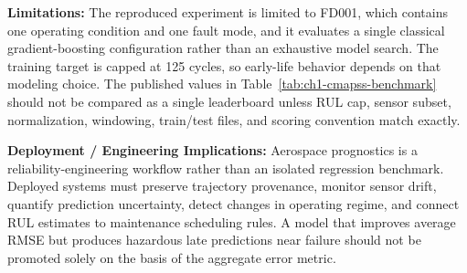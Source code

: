 \textbf{Limitations:} The reproduced experiment is limited to FD001, which contains one operating condition and one fault mode, and it evaluates a single classical gradient-boosting configuration rather than an exhaustive model search. The training target is capped at 125 cycles, so early-life behavior depends on that modeling choice. The published values in Table~\ref{tab:ch1-cmapss-benchmark} should not be compared as a single leaderboard unless RUL cap, sensor subset, normalization, windowing, train/test files, and scoring convention match exactly.

\textbf{Deployment / Engineering Implications:} Aerospace prognostics is a reliability-engineering workflow rather than an isolated regression benchmark. Deployed systems must preserve trajectory provenance, monitor sensor drift, quantify prediction uncertainty, detect changes in operating regime, and connect RUL estimates to maintenance scheduling rules. A model that improves average RMSE but produces hazardous late predictions near failure should not be promoted solely on the basis of the aggregate error metric.
